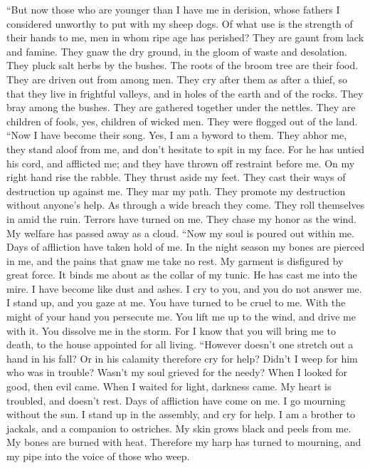  ``But now those who are younger than I have me in
derision, whose fathers I considered unworthy to put with my sheep dogs.
 Of what use is the strength of their hands to me, men in
whom ripe age has perished?  They are gaunt from lack and
famine. They gnaw the dry ground, in the gloom of waste and desolation.
 They pluck salt herbs by the bushes. The roots of the
broom tree are their food.  They are driven out from among
men. They cry after them as after a thief,  so that they
live in frightful valleys, and in holes of the earth and of the rocks.
 They bray among the bushes. They are gathered together
under the nettles.  They are children of fools, yes,
children of wicked men. They were flogged out of the land.
 ``Now I have become their song. Yes, I am a byword to
them.  They abhor me, they stand aloof from me, and don't
hesitate to spit in my face.  For he has untied his cord,
and afflicted me; and they have thrown off restraint before me.
 On my right hand rise the rabble. They thrust aside my
feet. They cast their ways of destruction up against me. 
They mar my path. They promote my destruction without anyone's help.
 As through a wide breach they come. They roll themselves
in amid the ruin.  Terrors have turned on me. They chase
my honor as the wind. My welfare has passed away as a cloud.
 ``Now my soul is poured out within me. Days of
affliction have taken hold of me.  In the night season my
bones are pierced in me, and the pains that gnaw me take no rest.
 My garment is disfigured by great force. It binds me
about as the collar of my tunic.  He has cast me into the
mire. I have become like dust and ashes.  I cry to you,
and you do not answer me. I stand up, and you gaze at me.
 You have turned to be cruel to me. With the might of
your hand you persecute me.  You lift me up to the wind,
and drive me with it. You dissolve me in the storm.  For
I know that you will bring me to death, to the house appointed for all
living.  ``However doesn't one stretch out a hand in his
fall? Or in his calamity therefore cry for help?  Didn't
I weep for him who was in trouble? Wasn't my soul grieved for the needy?
 When I looked for good, then evil came. When I waited
for light, darkness came.  My heart is troubled, and
doesn't rest. Days of affliction have come on me.  I go
mourning without the sun. I stand up in the assembly, and cry for help.
 I am a brother to jackals, and a companion to ostriches.
 My skin grows black and peels from me. My bones are
burned with heat.  Therefore my harp has turned to
mourning, and my pipe into the voice of those who weep.

